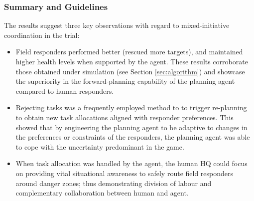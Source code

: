 \subsubsection{Summary and Guidelines}\label{sec:summary}
\noindent The results suggest three key observations with regard to mixed-initiative coordination in the trial:
\begin{itemize}
\item Field responders performed better (rescued more targets), and maintained higher health levels when supported by the agent.  These results corroborate those obtained under simulation (see Section \ref{sec:algorithm}) and  showcase the superiority in the forward-planning capability of the planning agent compared to human responders. 
 
\item Rejecting tasks was a frequently employed method to to trigger re-planning to obtain new task allocations aligned with responder preferences. This showed that by engineering the planning agent to be adaptive to changes in the preferences or constraints of the responders, the planning agent was able to cope with the uncertainty predominant in the game.

\item When task allocation was handled by the agent, the human HQ could focus on providing vital situational awareness to safely route field responders around danger zones; thus demonstrating division of labour and complementary collaboration between human and agent.
\end{itemize}

